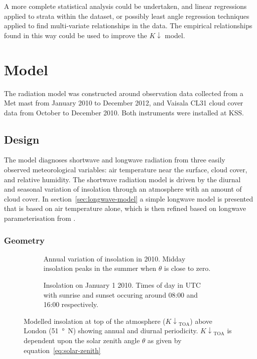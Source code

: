 \documentclass[a4paper,titlepage, twoside]{report}
\newcommand\Kdown{K\!\!\downarrow}
\newcommand\Kdowntoa{{K\!\!\downarrow}_\mathrm{TOA}}
\begin{document}
A more complete statistical analysis could be undertaken, and linear regressions applied to strata within the dataset, or possibly least angle regression techniques applied to find multi-variate relationships in the data. The empirical relationships found in this way could be used to improve the $\Kdown$ model.


\chapter{Model}
The radiation model was constructed around observation data collected from a Met mast from January 2010 to December 2012, and Vaisala CL31 cloud cover data from October to December 2010.  Both instruments were installed at KSS.

\section{Design}
The model diagnoses shortwave and longwave radiation from three easily observed meteorological variables: air temperature near the surface, cloud cover, and relative humidity.  The shortwave radiation model is driven by the diurnal and seasonal variation of insolation through an atmosphere with an amount of cloud cover.  In section~\ref{sec:longwave-model} a simple longwave model is presented that is based on air temperature alone, which is then refined based on longwave parameterisation from \cite{loridan}.

\subsection{Geometry}
\begin{figure}
\centering
\begin{subfigure}{0.52\textwidth}
\hspace{-1em}

\caption{Annual variation of insolation in 2010.  Midday insolation peaks in the summer when $\theta$ is close to zero.}
\end{subfigure}
\hfill
\begin{subfigure}{0.4\textwidth}
\hspace{-2.2em}

\caption{Insolation on January 1 2010.  Times of day in UTC with sunrise and sunset occuring around 08:00 and 16:00 respectively.}
\end{subfigure}
\caption{Modelled insolation at top of the atmosphere ($\Kdowntoa$) above London (\SI{51}{\degree N}) showing annual and diurnal periodicity.  $\Kdowntoa$ is dependent upon the solar zenith angle $\theta$ as given by equation~\ref{eq:solar-zenith}}
\label{fig:toa-model}
\end{figure}
\end{document}
